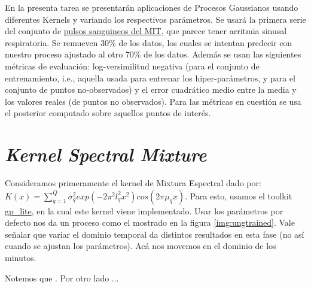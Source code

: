 \documentclass[letterpaper,11pt,oneside]{article}
\theoremstyle{break}
\begin{document}
	





\inserttitle

En la presenta tarea se presentarán aplicaciones de Procesos Gaussianos usando diferentes Kernels y variando los respectivos parámetros. Se usará la primera serie del conjunto de \href{https://ecg.mit.edu/time-series/}{pulsos sanguineos del MIT}, que parece tener arritmia sinusal respiratoria. Se remueven 30\% de los datos, los cuales se intentan predecir con nuestro proceso ajustado al otro 70\% de los datos. Además se usan las siguientes métricas de evaluación: log-versimilitud negativa (para el conjunto de entrenamiento, i.e., aquella usada para entrenar los hiper-parámetros, y para el conjunto de puntos no-observados) y el error cuadrático medio entre la media y los valores reales (de puntos no observados). Para las métricas en cuestión se usa el posterior computado sobre aquellos puntos de interés.

\section{\textit{Kernel Spectral Mixture}}
Consideramos primeramente el kernel de Mixtura Espectral dado por: $K(x)=\displaystyle \sum^Q_{q=1}\sigma^2_q exp(-2\pi^2l^2_qx^2)cos(2\pi\mu_qx)$. Para esto, usamos el toolkit \href{https://github.com/GAMES-UChile/The_Art_of_Gaussian_Processes}{gp\_lite}, en la cual este kernel viene implementado. Usar los parámetros por defecto nos da un proceso como el mostrado en la figura \ref{img:ungtrained}. Vale señalar que variar el dominio temporal da distintos resultados en esta fase (no así cuando se ajustan los parámetros). Acá nos movemos en el dominio de los minutos.


Notemos que \lipsum[1]. Por otro lado ...



\end{document}
